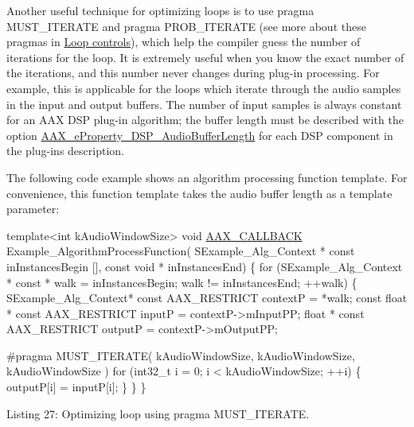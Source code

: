 Another useful technique for optimizing loops is to use {\ttfamily pragma M\+U\+S\+T\+\_\+\+I\+T\+E\+R\+A\+T\+E} and {\ttfamily pragma P\+R\+O\+B\+\_\+\+I\+T\+E\+R\+A\+T\+E} (see more about these pragmas in \hyperlink{a00362_subsubsection__loop_controls_}{Loop controls}), which help the compiler guess the number of iterations for the loop. It is extremely useful when you know the exact number of the iterations, and this number never changes during plug-\/in processing. For example, this is applicable for the loops which iterate through the audio samples in the input and output buffers. The number of input samples is always constant for an A\+A\+X D\+S\+P plug-\/in algorithm; the buffer length must be described with the option \hyperlink{a00283_a6571f4e41a5dd06e4067249228e2249ea09fbd1cbcae0e86ad81005258dc1b67e}{A\+A\+X\+\_\+e\+Property\+\_\+\+D\+S\+P\+\_\+\+Audio\+Buffer\+Length} for each D\+S\+P component in the plug-\/in\textquotesingle{}s description.

The following code example shows an algorithm processing function template. For convenience, this function template takes the audio buffer length as a template parameter\+:


\begin{DoxyCode}
\textcolor{keyword}{template}<\textcolor{keywordtype}{int} kAudioWindowSize>
\textcolor{keywordtype}{void} \hyperlink{a00149_aaa22112139aa627574b1ef562f579d43}{AAX\_CALLBACK}
Example\_AlgorithmProcessFunction( SExample\_Alg\_Context * \textcolor{keyword}{const} inInstancesBegin [], \textcolor{keyword}{const} \textcolor{keywordtype}{void} * 
      inInstancesEnd)
\{
   \textcolor{keywordflow}{for} (SExample\_Alg\_Context * \textcolor{keyword}{const} * walk = inInstancesBegin; walk != inInstancesEnd; ++walk)
   \{
      SExample\_Alg\_Context* \textcolor{keyword}{const} AAX\_RESTRICT contextP = *walk;
      \textcolor{keyword}{const} \textcolor{keywordtype}{float} * \textcolor{keyword}{const} AAX\_RESTRICT inputP = contextP->mInputPP;
      \textcolor{keywordtype}{float} * \textcolor{keyword}{const} AAX\_RESTRICT outputP = contextP->mOutputPP;

\textcolor{preprocessor}{      #pragma MUST\_ITERATE( kAudioWindowSize, kAudioWindowSize, kAudioWindowSize )}
      \textcolor{keywordflow}{for} (int32\_t i = 0; i < kAudioWindowSize; ++i)
      \{
         outputP[i] = inputP[i];
      \}
   \}
\} 
\end{DoxyCode}
  Listing 27\+: Optimizing loop using pragma M\+U\+S\+T\+\_\+\+I\+T\+E\+R\+A\+T\+E.

